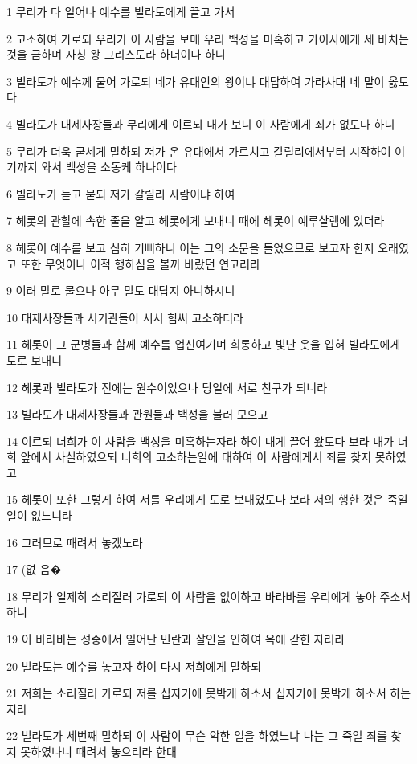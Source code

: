 \par 1 무리가 다 일어나 예수를 빌라도에게 끌고 가서
\par 2 고소하여 가로되 우리가 이 사람을 보매 우리 백성을 미혹하고 가이사에게 세 바치는 것을 금하며 자칭 왕 그리스도라 하더이다 하니
\par 3 빌라도가 예수께 물어 가로되 네가 유대인의 왕이냐 대답하여 가라사대 네 말이 옳도다
\par 4 빌라도가 대제사장들과 무리에게 이르되 내가 보니 이 사람에게 죄가 없도다 하니
\par 5 무리가 더욱 굳세게 말하되 저가 온 유대에서 가르치고 갈릴리에서부터 시작하여 여기까지 와서 백성을 소동케 하나이다
\par 6 빌라도가 듣고 묻되 저가 갈릴리 사람이냐 하여
\par 7 헤롯의 관할에 속한 줄을 알고 헤롯에게 보내니 때에 헤롯이 예루살렘에 있더라
\par 8 헤롯이 예수를 보고 심히 기뻐하니 이는 그의 소문을 들었으므로 보고자 한지 오래였고 또한 무엇이나 이적 행하심을 볼까 바랐던 연고러라
\par 9 여러 말로 물으나 아무 말도 대답지 아니하시니
\par 10 대제사장들과 서기관들이 서서 힘써 고소하더라
\par 11 헤롯이 그 군병들과 함께 예수를 업신여기며 희롱하고 빛난 옷을 입혀 빌라도에게 도로 보내니
\par 12 헤롯과 빌라도가 전에는 원수이었으나 당일에 서로 친구가 되니라
\par 13 빌라도가 대제사장들과 관원들과 백성을 불러 모으고
\par 14 이르되 너희가 이 사람을 백성을 미혹하는자라 하여 내게 끌어 왔도다 보라 내가 너희 앞에서 사실하였으되 너희의 고소하는일에 대하여 이 사람에게서 죄를 찾지 못하였고
\par 15 헤롯이 또한 그렇게 하여 저를 우리에게 도로 보내었도다 보라 저의 행한 것은 죽일 일이 없느니라
\par 16 그러므로 때려서 놓겠노라
\par 17 (없 음�
\par 18 무리가 일제히 소리질러 가로되 이 사람을 없이하고 바라바를 우리에게 놓아 주소서 하니
\par 19 이 바라바는 성중에서 일어난 민란과 살인을 인하여 옥에 갇힌 자러라
\par 20 빌라도는 예수를 놓고자 하여 다시 저희에게 말하되
\par 21 저희는 소리질러 가로되 저를 십자가에 못박게 하소서 십자가에 못박게 하소서 하는지라
\par 22 빌라도가 세번째 말하되 이 사람이 무슨 악한 일을 하였느냐 나는 그 죽일 죄를 찾지 못하였나니 때려서 놓으리라 한대
